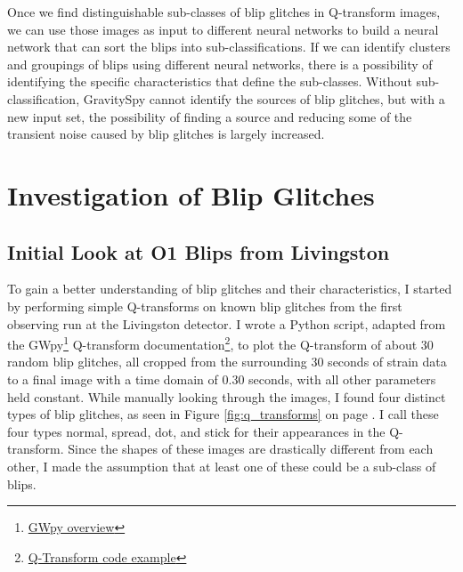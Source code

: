 \documentclass[a4paper]{article}
\begin{document}
Once we find distinguishable sub-classes of blip glitches in Q-transform images, we can use those images as input to different neural networks to build a neural network that can sort the blips into sub-classifications. If we can identify clusters and groupings of blips using different neural networks, there is a possibility of identifying the specific characteristics that define the sub-classes. Without sub-classification, GravitySpy cannot identify the sources of blip glitches, but with a new input set, the possibility of finding a source and reducing some of the transient noise caused by blip glitches is largely increased. 

\section{Investigation of Blip Glitches}

\subsection{Initial Look at O1 Blips from Livingston} \label{investigation}

To gain a better understanding of blip glitches and their characteristics, I started by performing simple Q-transforms on known blip glitches from the first observing run at the Livingston detector. I wrote a Python script, adapted from the GWpy\footnote{\href{https://gwpy.github.io/docs/stable/overview.html}{GWpy overview}} Q-transform documentation\footnote{\href{https://gwpy.github.io/docs/stable/examples/timeseries/qscan.html}{Q-Transform code example}}, to plot the Q-transform of about 30 random blip glitches, all cropped from the surrounding 30 seconds of strain data to a final image with a time domain of 0.30 seconds, with all other parameters held constant. While manually looking through the images, I found four distinct types of blip glitches, as seen in Figure \ref{fig:q_transforms} on page \pageref{fig:q_transforms}. I call these four types normal, spread, dot, and stick for their appearances in the Q-transform. Since the shapes of these images are drastically different from each other, I made the assumption that at least one of these could be a sub-class of blips.
\end{document}
